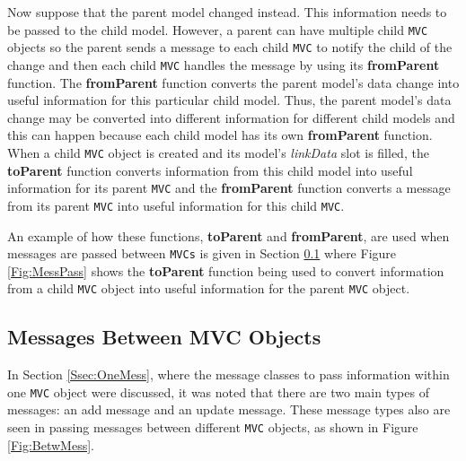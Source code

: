 \documentclass{article}[11pt]
\newcommand{\Rfunction}[1]{{\textbf{#1}}}
\newcommand{\Robject}[1]{{\texttt{#1}}}
\newcommand{\Rslot}[1]{\textsl{#1}}
\begin{document}
Now suppose that the parent model changed instead.  This information
needs to be passed to the child model.  However, a parent can have
multiple child \Robject{MVC} objects so the parent sends a message to each
child \Robject{MVC} to notify the child of the change and then each child
\Robject{MVC} handles the message by using its \Rfunction{fromParent}
function.  The \Rfunction{fromParent} function converts the parent
model's data change into useful information for this
particular child model.  Thus, the parent model's data
change may be converted into different information for different child models
and this can happen because each child model has
its own \Rfunction{fromParent} function.  When a child \Robject{MVC} object is
created and its model's \Rslot{linkData} slot is filled, the
\Rfunction{toParent} function converts information from this child
model into useful information for its parent \Robject{MVC} and the
\Rfunction{fromParent} function converts a message from its parent
\Robject{MVC} into useful information for this child \Robject{MVC}.

An example of how these functions, \Rfunction{toParent} and
\Rfunction{fromParent}, are used when messages are passed between
\Robject{MVCs} is given in Section \ref{Ssec:MultMess} where Figure
\ref{Fig:MessPass} shows the \Rfunction{toParent} function being used to
convert information from a child \Robject{MVC} object into useful information
for the parent \Robject{MVC} object.

\subsection{Messages Between MVC Objects}\label{Ssec:MultMess}

In Section \ref{Ssec:OneMess}, where the message classes to pass
information within one \Robject{MVC} object were discussed, it was noted that
there are two main types of messages: an add message and an update message.
These message types also are seen in passing messages between different
\Robject{MVC} objects, as shown in Figure \ref{Fig:BetwMess}.  
\end{document}

